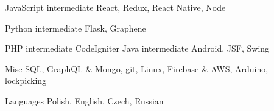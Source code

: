 
\begin{cvskills}

	\cvskill
		{JavaScript}
		{intermediate}
		{React, Redux, React Native, Node}

	\cvskill
		{Python}
		{intermediate}
		{Flask, Graphene}

	\cvskill
		{PHP}
		{intermediate}
		{CodeIgniter}
	\cvskill
		{Java}
		{intermediate}
		{Android, JSF, Swing}

	\cvskill
		{Misc}
		{}
			{SQL, GraphQL \& Mongo, git, Linux, Firebase \& AWS, Arduino, lockpicking}

	\cvskill
		{Languages}
		{}
		{Polish, English, Czech, Russian}

\end{cvskills}
